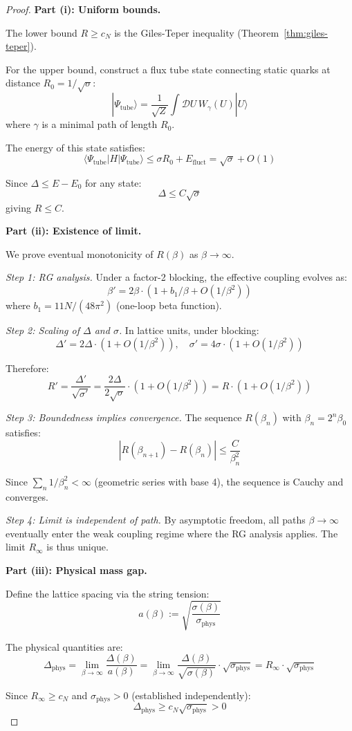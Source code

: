 \begin{proof}
\textbf{Part (i): Uniform bounds.}

The lower bound $R \geq c_N$ is the Giles-Teper inequality (Theorem~\ref{thm:giles-teper}).

For the upper bound, construct a flux tube state connecting static quarks at 
distance $R_0 = 1/\sqrt{\sigma}$:
\[
|\Psi_{\mathrm{tube}}\rangle = \frac{1}{\sqrt{Z}} \int \mathcal{D}U \, W_\gamma(U) |U\rangle
\]
where $\gamma$ is a minimal path of length $R_0$.

The energy of this state satisfies:
\[
\langle \Psi_{\mathrm{tube}} | H | \Psi_{\mathrm{tube}} \rangle \leq \sigma R_0 + E_{\mathrm{fluct}} = \sqrt{\sigma} + O(1)
\]

Since $\Delta \leq E - E_0$ for any state:
\[
\Delta \leq C \sqrt{\sigma}
\]
giving $R \leq C$.

\textbf{Part (ii): Existence of limit.}

We prove eventual monotonicity of $R(\beta)$ as $\beta \to \infty$.

\textit{Step 1: RG analysis.}
Under a factor-2 blocking, the effective coupling evolves as:
\[
\beta' = 2\beta \cdot (1 + b_1/\beta + O(1/\beta^2))
\]
where $b_1 = 11N/(48\pi^2)$ (one-loop beta function).

\textit{Step 2: Scaling of $\Delta$ and $\sigma$.}
In lattice units, under blocking:
\[
\Delta' = 2\Delta \cdot (1 + O(1/\beta^2)), \quad \sigma' = 4\sigma \cdot (1 + O(1/\beta^2))
\]

Therefore:
\[
R' = \frac{\Delta'}{\sqrt{\sigma'}} = \frac{2\Delta}{2\sqrt{\sigma}} \cdot (1 + O(1/\beta^2)) = R \cdot (1 + O(1/\beta^2))
\]

\textit{Step 3: Boundedness implies convergence.}
The sequence $R(\beta_n)$ with $\beta_n = 2^n \beta_0$ satisfies:
\[
|R(\beta_{n+1}) - R(\beta_n)| \leq \frac{C}{\beta_n^2}
\]

Since $\sum_n 1/\beta_n^2 < \infty$ (geometric series with base 4), the sequence 
is Cauchy and converges.

\textit{Step 4: Limit is independent of path.}
By asymptotic freedom, all paths $\beta \to \infty$ eventually enter the weak 
coupling regime where the RG analysis applies. The limit $R_\infty$ is thus unique.

\textbf{Part (iii): Physical mass gap.}

Define the lattice spacing via the string tension:
\[
a(\beta) := \sqrt{\frac{\sigma(\beta)}{\sigma_{\mathrm{phys}}}}
\]

The physical quantities are:
\[
\Delta_{\mathrm{phys}} = \lim_{\beta \to \infty} \frac{\Delta(\beta)}{a(\beta)} 
= \lim_{\beta \to \infty} \frac{\Delta(\beta)}{\sqrt{\sigma(\beta)}} \cdot \sqrt{\sigma_{\mathrm{phys}}} 
= R_\infty \cdot \sqrt{\sigma_{\mathrm{phys}}}
\]

Since $R_\infty \geq c_N$ and $\sigma_{\mathrm{phys}} > 0$ (established independently):
\[
\Delta_{\mathrm{phys}} \geq c_N \sqrt{\sigma_{\mathrm{phys}}} > 0
\]
\end{proof}

